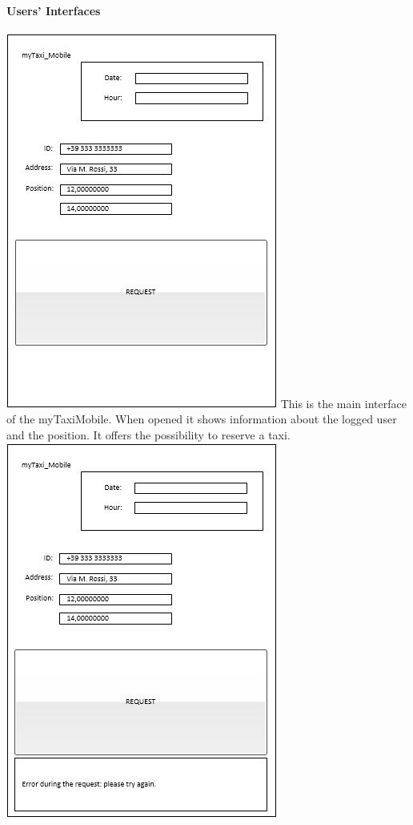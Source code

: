 \documentclass[12pt,a4paper]{book}
\begin{document}
				\paragraph{Users' Interfaces}
				\hfill\break	
				\includegraphics {mobile_page1}
				\hfill\break
				This is the main interface of the myTaxi\textunderscore Mobile. When opened it shows information about the logged user and the position. It offers the possibility to reserve a taxi.
				\hfill\break
				\hfill\break	
				\includegraphics {mobile_page2}
\end{document}
